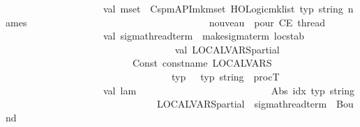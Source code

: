 \begin{isabellebody}
\ \ \ \ \ \ \ \ \ \ \ \ \ \ \ \ \ \ \ \ val\ mset\ {\isacharequal}{\kern0pt}\ Cspm{\isacharunderscore}{\kern0pt}API{\isachardot}{\kern0pt}mk{\isacharunderscore}{\kern0pt}mset\ {\isacharparenleft}{\kern0pt}HOLogic{\isachardot}{\kern0pt}mk{\isacharunderscore}{\kern0pt}list\ {\isacharat}{\kern0pt}{\isacharbraceleft}{\kern0pt}typ\ string{\isacharbraceright}{\kern0pt}\ names{\isacharparenright}{\kern0pt}\isanewline
\ \ \ \ \ \ \ \ \ \ \ \ \ \ \isanewline
\ \ \ \ \ \ \ \ \ \ \ \ \ \ \ \ \ \ \ \ {\isacharparenleft}{\kern0pt}{\isacharasterisk}{\kern0pt}\ {\isacharminus}{\kern0pt}{\isacharminus}{\kern0pt}{\isacharminus}{\kern0pt}\ nouveau\ {\isasymsigma}\ pour\ CE\ thread\ {\isacharminus}{\kern0pt}{\isacharminus}{\kern0pt}{\isacharminus}{\kern0pt}\ {\isacharasterisk}{\kern0pt}{\isacharparenright}{\kern0pt}\isanewline
\ \ \ \ \ \ \ \ \ \ \ \ \ \ \ \ \ \ \ \ val\ sigma{\isacharunderscore}{\kern0pt}thread{\isacharunderscore}{\kern0pt}term\ {\isacharequal}{\kern0pt}\ make{\isacharunderscore}{\kern0pt}sigma{\isacharunderscore}{\kern0pt}term\ locstab\isanewline
\ \ \ \ \ \ \ \ \ \ \ \ \ \ \isanewline
\ \ \ \ \ \ \ \ \ \ \ \ \ \ \ \ \ \ \ \ val\ LOCALVARS{\isacharunderscore}{\kern0pt}partial\ {\isacharequal}{\kern0pt}\isanewline
\ \ \ \ \ \ \ \ \ \ \ \ \ \ \ \ \ \ \ \ \ \ \ \ \ \ Const\ {\isacharparenleft}{\kern0pt}{\isacharat}{\kern0pt}{\isacharbraceleft}{\kern0pt}const{\isacharunderscore}{\kern0pt}name\ LOCALVARS{\isacharbraceright}{\kern0pt}{\isacharcomma}{\kern0pt}\isanewline
\ \ \ \ \ \ \ \ \ \ \ \ \ \ \ \ \ \ \ \ \ \ \ \ \ \ \ \ \ \ \ \ \ \ {\isacharat}{\kern0pt}{\isacharbraceleft}{\kern0pt}typ\ {\isasymsigma}{\isacharbraceright}{\kern0pt}\ {\isacharminus}{\kern0pt}{\isacharminus}{\kern0pt}{\isachargreater}{\kern0pt}\ {\isacharat}{\kern0pt}{\isacharbraceleft}{\kern0pt}typ\ string{\isacharbraceright}{\kern0pt}\ {\isacharminus}{\kern0pt}{\isacharminus}{\kern0pt}{\isachargreater}{\kern0pt}\ procT{\isacharparenright}{\kern0pt}\isanewline
\ \ \ \ \ \ \ \ \ \ \ \ \ \ \isanewline
\ \ \ \ \ \ \ \ \ \ \ \ \ \ \ \ \ \ \ \ val\ lam\ {\isacharequal}{\kern0pt}\isanewline
\ \ \ \ \ \ \ \ \ \ \ \ \ \ \ \ \ \ \ \ \ \ \ \ \ \ Abs\ {\isacharparenleft}{\kern0pt}{\isachardoublequote}{\kern0pt}idx{\isachardoublequote}{\kern0pt}{\isacharcomma}{\kern0pt}\ {\isacharat}{\kern0pt}{\isacharbraceleft}{\kern0pt}typ\ string{\isacharbraceright}{\kern0pt}{\isacharcomma}{\kern0pt}\isanewline
\ \ \ \ \ \ \ \ \ \ \ \ \ \ \ \ \ \ \ \ \ \ \ \ \ \ \ \ \ \ \ LOCALVARS{\isacharunderscore}{\kern0pt}partial\ {\isachardollar}{\kern0pt}\ sigma{\isacharunderscore}{\kern0pt}thread{\isacharunderscore}{\kern0pt}term\ {\isachardollar}{\kern0pt}\ Bound\ {}{\isacharparenright}{\kern0pt}\isanewline

\end{isabellebody}
